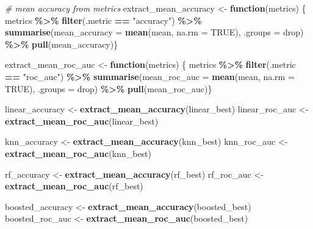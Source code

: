 \documentclass[
]{article}
\newenvironment{Shaded}{\begin{snugshade}}{\end{snugshade}}
\newcommand{\AttributeTok}[1]{\textcolor[rgb]{0.13,0.29,0.53}{#1}}
\newcommand{\CommentTok}[1]{\textcolor[rgb]{0.56,0.35,0.01}{\textit{#1}}}
\newcommand{\ConstantTok}[1]{\textcolor[rgb]{0.56,0.35,0.01}{#1}}
\newcommand{\ControlFlowTok}[1]{\textcolor[rgb]{0.13,0.29,0.53}{\textbf{#1}}}
\newcommand{\FunctionTok}[1]{\textcolor[rgb]{0.13,0.29,0.53}{\textbf{#1}}}
\newcommand{\NormalTok}[1]{#1}
\newcommand{\OtherTok}[1]{\textcolor[rgb]{0.56,0.35,0.01}{#1}}
\newcommand{\SpecialCharTok}[1]{\textcolor[rgb]{0.81,0.36,0.00}{\textbf{#1}}}
\newcommand{\StringTok}[1]{\textcolor[rgb]{0.31,0.60,0.02}{#1}}
\begin{document}
\begin{Shaded}
\begin{Highlighting}[]
\CommentTok{\# mean accuracy from metrics}
\NormalTok{extract\_mean\_accuracy }\OtherTok{\textless{}{-}} \ControlFlowTok{function}\NormalTok{(metrics) \{}
\NormalTok{  metrics }\SpecialCharTok{\%\textgreater{}\%}
    \FunctionTok{filter}\NormalTok{(.metric }\SpecialCharTok{==} \StringTok{"accuracy"}\NormalTok{) }\SpecialCharTok{\%\textgreater{}\%}
    \FunctionTok{summarise}\NormalTok{(}\AttributeTok{mean\_accuracy =} \FunctionTok{mean}\NormalTok{(mean, }\AttributeTok{na.rm =} \ConstantTok{TRUE}\NormalTok{), }\AttributeTok{.groups =} \StringTok{\textquotesingle{}drop\textquotesingle{}}\NormalTok{) }\SpecialCharTok{\%\textgreater{}\%}
    \FunctionTok{pull}\NormalTok{(mean\_accuracy)\}}

\NormalTok{extract\_mean\_roc\_auc }\OtherTok{\textless{}{-}} \ControlFlowTok{function}\NormalTok{(metrics) \{}
\NormalTok{  metrics }\SpecialCharTok{\%\textgreater{}\%}
    \FunctionTok{filter}\NormalTok{(.metric }\SpecialCharTok{==} \StringTok{"roc\_auc"}\NormalTok{) }\SpecialCharTok{\%\textgreater{}\%}
    \FunctionTok{summarise}\NormalTok{(}\AttributeTok{mean\_roc\_auc =} \FunctionTok{mean}\NormalTok{(mean, }\AttributeTok{na.rm =} \ConstantTok{TRUE}\NormalTok{), }\AttributeTok{.groups =} \StringTok{\textquotesingle{}drop\textquotesingle{}}\NormalTok{) }\SpecialCharTok{\%\textgreater{}\%}
    \FunctionTok{pull}\NormalTok{(mean\_roc\_auc)\}}


\NormalTok{linear\_accuracy }\OtherTok{\textless{}{-}} \FunctionTok{extract\_mean\_accuracy}\NormalTok{(linear\_best)}
\NormalTok{linear\_roc\_auc }\OtherTok{\textless{}{-}} \FunctionTok{extract\_mean\_roc\_auc}\NormalTok{(linear\_best)}

\NormalTok{knn\_accuracy }\OtherTok{\textless{}{-}} \FunctionTok{extract\_mean\_accuracy}\NormalTok{(knn\_best)}
\NormalTok{knn\_roc\_auc }\OtherTok{\textless{}{-}} \FunctionTok{extract\_mean\_roc\_auc}\NormalTok{(knn\_best)}

\NormalTok{rf\_accuracy }\OtherTok{\textless{}{-}} \FunctionTok{extract\_mean\_accuracy}\NormalTok{(rf\_best)}
\NormalTok{rf\_roc\_auc }\OtherTok{\textless{}{-}} \FunctionTok{extract\_mean\_roc\_auc}\NormalTok{(rf\_best)}

\NormalTok{boosted\_accuracy }\OtherTok{\textless{}{-}} \FunctionTok{extract\_mean\_accuracy}\NormalTok{(boosted\_best)}
\NormalTok{boosted\_roc\_auc }\OtherTok{\textless{}{-}} \FunctionTok{extract\_mean\_roc\_auc}\NormalTok{(boosted\_best)}


\end{Highlighting}
\end{Shaded}
\end{document}
